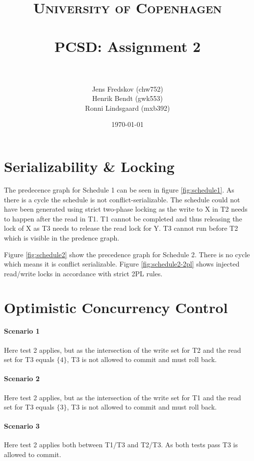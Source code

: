 \documentclass[a4paper, 11pt]{article}
\title{ 
\normalfont \normalsize 
\textsc{University of Copenhagen} \\ [25pt]
\horrule{0.5pt} \\[0.4cm]
\huge PCSD: Assignment 2 \\
\horrule{2pt} \\[0.5cm]
}
\author{Jens Fredskov (chw752)\\Henrik Bendt (gwk553)\\Ronni Lindsgaard (mxb392)} %
\date{\normalsize\today} %
\begin{document}
\maketitle
\pagebreak

\section{Serializability \& Locking}
The predecence graph for Schedule 1 can be seen in figure \ref{fig:schedule1}.
As there is a cycle the schedule is not conflict-serializable. The schedule
could not have been generated using strict two-phase locking as the write to X
in T2 needs to happen after the read in T1. T1 cannot be completed and thus
releasing the lock of X as T3 needs to release the read lock for Y. T3 cannot
run before T2 which is visible in the predence graph. 



Figure \ref{fig:schedule2} show the precedence graph for Schedule 2. There is no
cycle which means it is conflict serializable. Figure \ref{fig:schedule2-2pl}
shows injected read/write locks in accordance with strict 2PL rules.
 



\section{Optimistic Concurrency Control} %
\label{sec:optimistic_concurrency_control}

\paragraph{Scenario 1} %
\label{par:scenario_1}

Here test 2 applies, but as the intersection of the write set for T2 and the read set for T3 equals $\{4\}$, T3 is not allowed to commit and must roll back.


\paragraph{Scenario 2} %
\label{par:scenario_2}

Here test 2 applies, but as the intersection of the write set for T1 and the read set for T3 equals $\{3\}$, T3 is not allowed to commit and must roll back. 


\paragraph{Scenario 3} %
\label{par:scenario_3}

Here test 2 applies both between T1/T3 and T2/T3. As both tests pass T3 is allowed to commit.


\end{document}
